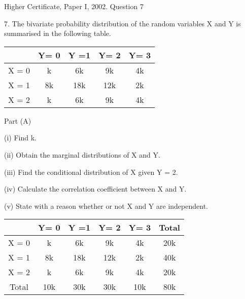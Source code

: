 \documentclass[a4paper,12pt]{article}
\begin{document}
Higher Certificate, Paper I, 2002. Question 7
\begin{framed}
7. The bivariate probability distribution of the random variables X and Y is
summarised in the following table.

\begin{center}
\begin{tabular}{|c|c|c|c|c|} \hline 
  &  Y= 0 & Y =1 & Y= 2 & Y= 3\\ \hline 
X = 0 & k & 6k & 9k & 4k \\ \hline 
X = 1 & 8k & 18k & 12k & 2k \\ \hline 
X = 2 & k & 6k & 9k & 4k \\ \hline 
\end{tabular}
\end{center}

Part (A)

(i) Find k.

(ii) Obtain the marginal distributions of X and Y.

(iii) Find the conditional distribution of X given Y = 2.

(iv) Calculate the correlation coefficient between X and Y.

(v) State with a reason whether or not X and Y are independent.


\end{framed}


\begin{center}
\begin{tabular}{|c||c|c|c|c||c|}
  &  Y= 0 & Y =1 & Y= 2 & Y= 3 & Total\\ \hline 
X = 0 & k & 6k & 9k & 4k & 20k\\ \hline 
X = 1 & 8k & 18k & 12k & 2k & 40k\\ \hline 
X = 2 & k & 6k & 9k & 4k &  20k\\ \hline  \hline
Total & 10k  &30k & 30k & 10k &80k \\ \hline 
\end{tabular}
\end{center}
\end{document}
